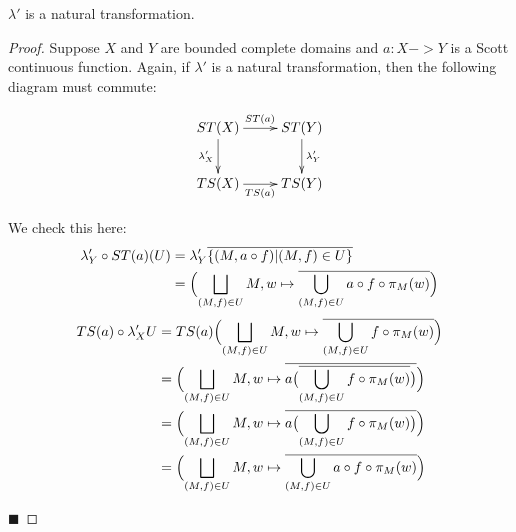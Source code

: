 \begin{proposition}
$\lambda'$ is a natural transformation.
\end{proposition}
\begin{proof}
Suppose $X$ and $Y$ are bounded complete domains and $a:X->Y$ is a Scott continuous function.  Again, if $\lambda'$ is a natural transformation, then the following diagram must commute:

\[
\xymatrix{
ST(X)\ar[r]^{ST(a)}\ar[d]_{\lambda'_X} & ST(Y)\ar[d]^{\lambda'_Y} \\
TS(X)\ar[r]_{TS(a)} &TS(Y)
}
\]

We check this here:
\begin{align*}
\lambda'_Y\circ ST(a)(U) &= \lambda'_Y \overline{\{(M,a\circ f)|(M,f)\in U\}} \\
&= \Bigl(\bigsqcup_{(M,f)\in U} M, w\mapsto\overline{\bigcup_{(M,f)\in U} a\circ f\circ \pi_M(w)}\Bigr)
\end{align*}
\begin{align*}
TS(a)\circ \lambda'_X U &= TS(a) \Bigl(\bigsqcup_{(M,f)\in U} M, w\mapsto \overline{\bigcup_{(M,f)\in U} f\circ \pi_M(w)}\Bigr) \\
&= \Bigl(\bigsqcup_{(M,f)\in U} M, w\mapsto\overline{ a\bigl(\overline{\bigcup_{(M,f)\in U} f\circ \pi_M(w)}\bigr)}\Bigr) \\
&= \Bigl(\bigsqcup_{(M,f)\in U} M, w\mapsto\overline{ a\bigl(\bigcup_{(M,f)\in U} f\circ \pi_M(w)\bigr)}\Bigr) \\
&= \Bigl(\bigsqcup_{(M,f)\in U} M, w\mapsto\overline{ \bigcup_{(M,f)\in U} a\circ f\circ \pi_M(w)}\Bigr) \\
\end{align*}

\vspace{-.25in}
\hfill $\blacksquare$
\end{proof}


